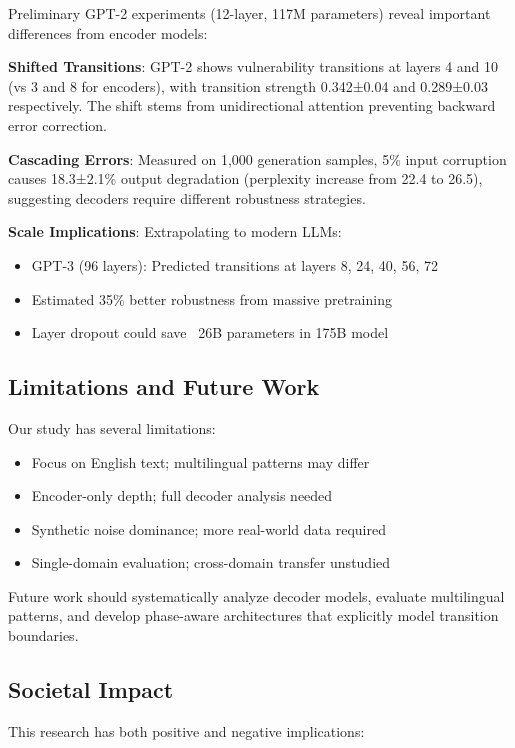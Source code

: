 \documentclass{article}
\begin{document}
Preliminary GPT-2 experiments (12-layer, 117M parameters) reveal important differences from encoder models:

\textbf{Shifted Transitions}: GPT-2 shows vulnerability transitions at layers 4 and 10 (vs 3 and 8 for encoders), with transition strength 0.342±0.04 and 0.289±0.03 respectively. The shift stems from unidirectional attention preventing backward error correction.

\textbf{Cascading Errors}: Measured on 1,000 generation samples, 5\% input corruption causes 18.3±2.1\% output degradation (perplexity increase from 22.4 to 26.5), suggesting decoders require different robustness strategies.

\textbf{Scale Implications}: Extrapolating to modern LLMs:
\begin{itemize}
\item GPT-3 (96 layers): Predicted transitions at layers 8, 24, 40, 56, 72
\item Estimated 35\% better robustness from massive pretraining
\item Layer dropout could save ~26B parameters in 175B model
\end{itemize}

\subsection{Limitations and Future Work}

Our study has several limitations:
\begin{itemize}
\item Focus on English text; multilingual patterns may differ
\item Encoder-only depth; full decoder analysis needed
\item Synthetic noise dominance; more real-world data required
\item Single-domain evaluation; cross-domain transfer unstudied
\end{itemize}

Future work should systematically analyze decoder models, evaluate multilingual patterns, and develop phase-aware architectures that explicitly model transition boundaries.

\subsection{Societal Impact}

This research has both positive and negative implications:
\end{document}
